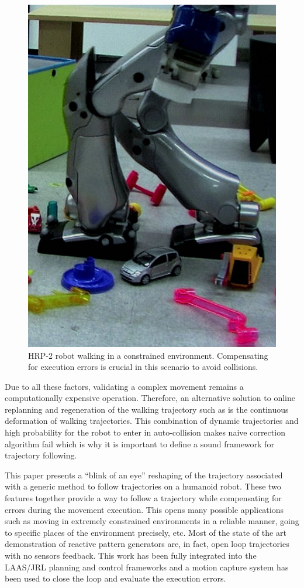 \begin{figure}[ht!]
  \begin{center}
    \includegraphics[width=.4\textwidth]{fig/exp2.jpg}
  \end{center}
  \caption{HRP-2 robot walking in a constrained
    environment. Compensating for execution errors is crucial in this
    scenario to avoid collisions. \label{fig:following}}
\end{figure}



Due to all these factors, validating a complex movement remains a
computationally expensive operation. Therefore, an alternative
solution to online replanning and regeneration of the walking
trajectory such as \cite{11icra.dimitrov, 10ar.herdt,
  06icra.nishiwaki, 05humanoids.michel} is the continuous deformation
of walking trajectories.  This combination of dynamic trajectories and
high probability for the robot to enter in auto-collision makes naive
correction algorithm fail which is why it is important to define a
sound framework for trajectory following.


This paper presents a ``blink of an eye'' reshaping of the trajectory
associated with a generic method to follow trajectories on a humanoid
robot. These two features together provide a way to follow a
trajectory while compensating for errors during the movement
execution. This opens many possible applications such as moving in
extremely constrained environments in a reliable manner, going to
specific places of the environment precisely, etc. Most of the state
of the art demonstration of reactive pattern generators are, in fact,
open loop trajectories with no sensors feedback. This work has been
fully integrated into the LAAS/JRL planning and control frameworks and
a motion capture system has been used to close the loop and evaluate
the execution errors.

